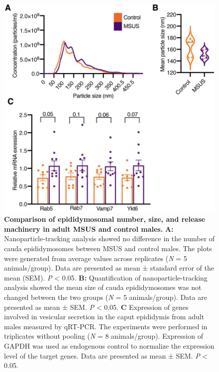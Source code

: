 \documentclass[12pt,twoside]{reedthesis}
\begin{document}
\begin{figure}[htbp]

{\centering \includegraphics{thesis_files/figure-latex/ef2-1} 

}

\caption[Comparison of epididymosomal number, size, and release machinery in adult MSUS and control males]{\textbf{Comparison of epididymosomal number, size, and release machinery in adult MSUS and control males.} \newline \textbf{A:} Nanoparticle-tracking analysis showed no difference in the number of cauda epididymosomes between MSUS and control males. The plots were generated from average values across replicates (\emph{N} = 5 animals/group). Data are presented as mean ± standard error of the mean (SEM). \emph{P} \textless{} 0.05. \newline \textbf{B:} Quantification of nanoparticle-tracking analysis showed the mean size of cauda epididymosomes was not changed between the two groups (\emph{N} = 5 animals/group). Data are presented as mean ± SEM. \emph{P} \textless{} 0.05. \newline \textbf{C} Expression of genes involved in vesicular secretion in the caput epididymis from adult males measured by qRT-PCR. The experiments were performed in triplicates without pooling (\emph{N} = 8 animals/group). \newline Expression of GAPDH was used as endogenous control to normalize the expression level of the target genes. Data are presented as mean ± SEM. \emph{P} \textless{} 0.05.}\label{fig:ef2}
\end{figure}
\end{document}

